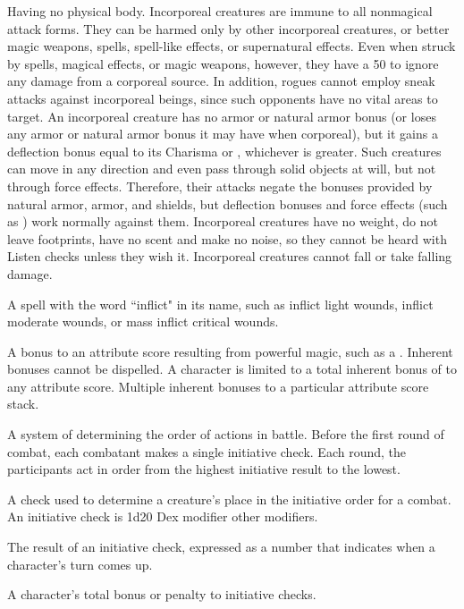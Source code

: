  Having no physical body. Incorporeal creatures are 
immune to all nonmagical attack forms. They can be harmed only by 
other incorporeal creatures,  or better magic weapons, spells, 
spell-like effects, or supernatural effects. Even when struck by spells, 
magical effects, or magic weapons, however, they have a 50%
to ignore any damage from a corporeal source. In addition, rogues 
cannot employ sneak attacks against incorporeal beings, since such 
opponents have no vital areas to target. An incorporeal creature has 
no armor or natural armor bonus (or loses any armor or natural 
armor bonus it may have when corporeal), but it gains a deflection 
bonus equal to its Charisma or , whichever is greater. 
Such creatures can move in any direction and even pass through 
solid objects at will, but not through force effects. Therefore, their 
attacks negate the bonuses provided by natural armor, armor, and 
shields, but deflection bonuses and force effects (such as ) work normally against them. Incorporeal creatures have no 
weight, do not leave footprints, have no scent and make no noise, so 
they cannot be heard with Listen checks unless they wish it. 
Incorporeal creatures cannot fall or take falling damage. 

 A spell with the word ``inflict" in its name, such as 
inflict light wounds,  inflict moderate wounds, or  mass inflict critical 
wounds. 

 A bonus to an attribute score resulting from 
powerful magic, such as a  . Inherent bonuses cannot be dispelled. A character is limited to a total inherent bonus of  to any 
attribute score. Multiple inherent bonuses to a particular attribute score stack.

 A system of determining the order of actions in battle. 
Before the first round of combat, each combatant makes a single 
initiative check. Each round, the participants act in order from the 
highest initiative result to the lowest. 

 A check used to determine a creature's place in 
the initiative order for a combat. An initiative check is 1d20 \add Dex 
modifier \add other modifiers. 

 The result of an initiative check, expressed as a 
number that indicates when a character's turn comes up. 

 A character's total bonus or penalty to initiative checks. 

